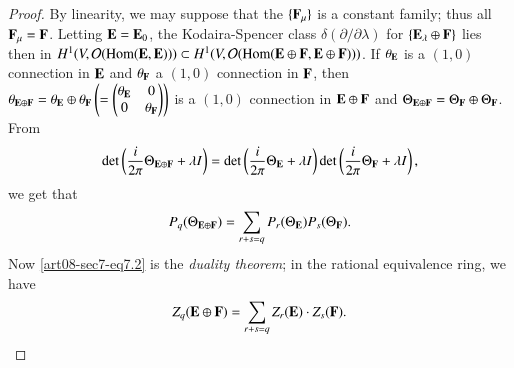 \begin{proof}
By linearity, we may suppose that the $\{\mathbf{F}_{\mu}\}$ is a constant family; thus all $\mathbf{F}_{\mu}=\mathbf{F}$. Letting $\mathbf{E}=\mathbf{E}_{0}$, the Kodaira-Spencer class $\delta(\partial/\partial \lambda)$ for $\{\mathbf{E}_{\lambda}\oplus \mathbf{F}\}$ lies then in $H^{1}(V,\mathcal{O}(\operatorname{\mathrm{Hom}}(\mathbf{E},\mathbf{E})))\subset H^{1}(V,\mathcal{O}(\operatorname{\mathrm{Hom}}(\mathbf{E}\oplus \mathbf{F},\mathbf{E}\oplus \mathbf{F})))$. If $\theta_{\mathbf{E}}$ is a $(1,0)$ connection in $\mathbf{E}$ and $\theta_{\mathbf{F}}$ a $(1,0)$ connection in $\mathbf{F}$, then $\theta_{\mathbf{E}\oplus \mathbf{F}}=\theta_{\mathbf{E}}\oplus \theta_{\mathbf{F}}\left(=\left(\begin{matrix} \theta_{\mathbf{E}} & 0\\ 0 &\theta_{\mathbf{F}}\end{matrix}\right)\right)$ is a $(1,0)$ connection in $\mathbf{E}\oplus\mathbf{F}$ and $\Theta_{\mathbf{E}\oplus\mathbf{F}}=\Theta_{\mathbf{F}}\oplus\Theta_{\mathbf{F}}$. From
$$
\det \left(\dfrac{i}{2\pi}\Theta_{\mathbf{E}\oplus\mathbf{F}}+\lambda I\right)=\det \left(\dfrac{i}{2\pi}\Theta_{\mathbf{E}}+\lambda I\right)\det \left(\dfrac{i}{2\pi}\Theta_{\mathbf{F}}+\lambda I\right),
$$
we get that
\begin{equation}
P_{q}(\Theta_{\mathbf{E}\oplus \mathbf{F}})=\sum\limits_{r+s=q}P_{r}(\Theta_{\mathbf{E}})P_{s}(\Theta_{\mathbf{F}}).\label{art08-sec7-eq7.2}
\end{equation}
Now \eqref{art08-sec7-eq7.2} is the {\em duality theorem}; in the rational equivalence ring, we have 
\begin{equation}
Z_{q}(\mathbf{E}\oplus \mathbf{F})=\sum\limits_{r+s=q}Z_{r}(\mathbf{E})\cdot Z_{s}(\mathbf{F}).\label{art08-sec7-eq7.3}
\end{equation}


\end{proof}
